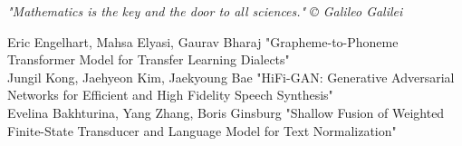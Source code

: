 \documentclass[10pt,a4paper]{report}
\begin{document}
\begin{displayquote}
     \textsl{"Mathematics is the key and the door to all sciences." ©  Galileo Galilei}
\end{displayquote}
\begin{thebibliography}{}
\bibitem{}Eric Engelhart, Mahsa Elyasi, Gaurav Bharaj "Grapheme-to-Phoneme Transformer Model for Transfer Learning Dialects" \\
\bibitem{}Jungil Kong, Jaehyeon Kim, Jaekyoung Bae "HiFi-GAN: Generative Adversarial Networks for Efficient and High Fidelity Speech Synthesis" \\
\bibitem{}Evelina Bakhturina, Yang Zhang, Boris Ginsburg "Shallow Fusion of Weighted Finite-State Transducer and Language Model for Text Normalization" \\
\end{thebibliography}
\end{document}
